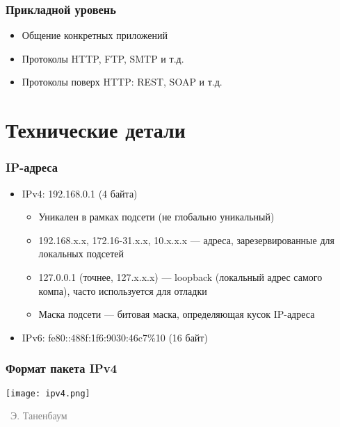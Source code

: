 \documentclass[xetex,mathserif,serif]{beamer}
\newcommand{\attribution}[1] {
\vspace{-5mm}\begin{flushright}\begin{scriptsize}\textcolor{gray}{\textcopyright\, #1}\end{scriptsize}\end{flushright}
}
\begin{document}
	\begin{frame}
		\frametitle{Прикладной уровень}
		\begin{itemize}
			\item Общение конкретных приложений
			\item Протоколы HTTP, FTP, SMTP и т.д.
			\item Протоколы поверх HTTP: REST, SOAP и т.д.
		\end{itemize}
	\end{frame}

	\section{Технические детали}

	\begin{frame}
		\frametitle{IP-адреса}
		\begin{itemize}
			\item IPv4: 192.168.0.1 (4 байта)
			\begin{itemize}
				\item Уникален в рамках подсети (не глобально уникальный)
				\item 192.168.x.x, 172.16-31.x.x, 10.x.x.x --- адреса, зарезервированные для локальных подсетей
				\item 127.0.0.1 (точнее, 127.x.x.x) --- loopback (локальный адрес самого компа), часто используется для отладки
				\item Маска подсети --- битовая маска, определяющая кусок IP-адреса
			\end{itemize}
			\item IPv6: fe80::488f:1f6:9030:46c7\%10 (16 байт)
		\end{itemize}
	\end{frame}

	\begin{frame}
		\frametitle{Формат пакета IPv4}
		\begin{center}
			\texttt{[image: ipv4.png]}
			\attribution{Э. Таненбаум}
		\end{center}
	\end{frame}
\end{document}
